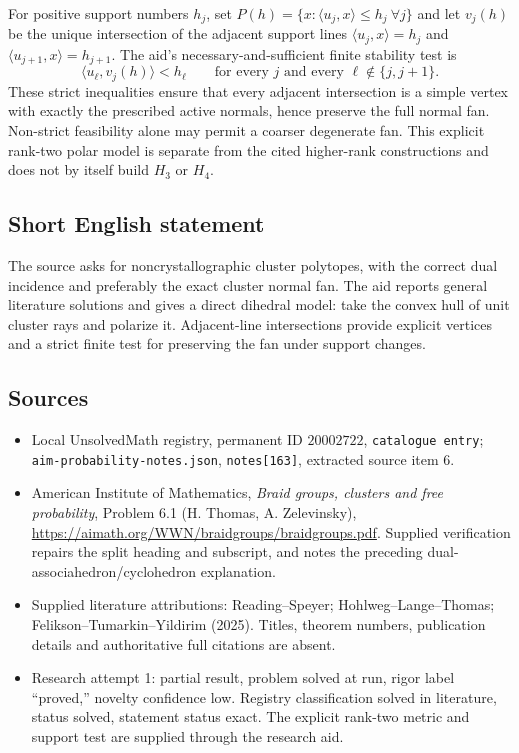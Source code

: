 \documentclass[11pt]{article}
\begin{document}
For positive support numbers $h_j$, set $P(h)=\{x:\langle u_j,x\rangle\leq h_j\ \forall j\}$ and let $v_j(h)$ be the unique intersection of the adjacent support lines $\langle u_j,x\rangle=h_j$ and $\langle u_{j+1},x\rangle=h_{j+1}$. The aid's necessary-and-sufficient finite stability test is
\[
\langle u_\ell,v_j(h)\rangle<h_\ell
\qquad\text{for every }j\text{ and every }\ell\notin\{j,j+1\}.
\]
These strict inequalities ensure that every adjacent intersection is a simple vertex with exactly the prescribed active normals, hence preserve the full normal fan. Non-strict feasibility alone may permit a coarser degenerate fan. This explicit rank-two polar model is separate from the cited higher-rank constructions and does not by itself build $H_3$ or $H_4$.
\subsection{Short English statement}
The source asks for noncrystallographic cluster polytopes, with the correct dual incidence and preferably the exact cluster normal fan. The aid reports general literature solutions and gives a direct dihedral model: take the convex hull of unit cluster rays and polarize it. Adjacent-line intersections provide explicit vertices and a strict finite test for preserving the fan under support changes.
\subsection{Sources}
\begin{itemize}
\item Local UnsolvedMath registry, permanent ID $20002722$, \texttt{catalogue entry}; \texttt{aim-probability-notes.json}, \texttt{notes[163]}, extracted source item 6.
\item American Institute of Mathematics, \emph{Braid groups, clusters and free probability}, Problem 6.1 (H. Thomas, A. Zelevinsky), \url{https://aimath.org/WWN/braidgroups/braidgroups.pdf}. Supplied verification repairs the split heading and subscript, and notes the preceding dual-associahedron/cyclohedron explanation.
\item Supplied literature attributions: Reading--Speyer; Hohlweg--Lange--Thomas; Felikson--Tumarkin--Yildirim (2025). Titles, theorem numbers, publication details and authoritative full citations are absent.
\item Research attempt 1: partial result, problem solved at run, rigor label ``proved,'' novelty confidence low. Registry classification solved in literature, status solved, statement status exact. The explicit rank-two metric and support test are supplied through the research aid.
\end{itemize}
\end{document}
